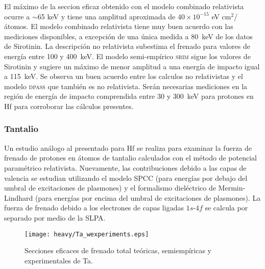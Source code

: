 El máximo de la seccion eficaz obtenido con el modelo combinado 
relativista ocurre a $\sim$65 keV y tiene una amplitud aproximada de 
$40\times 10^{-15}$ eV cm$^2$/átomos. 
El modelo combinado relativista tiene muy buen acuerdo con las 
mediciones disponibles, a excepción de una única medida a 80~keV de los 
datos de Sirotinin. La descripción no relativista subestima el frenado 
para valores de energía entre 100 y 400~keV. El modelo semi-empírico 
\textsc{srim} sigue los valores de Sirotinin y 
sugiere un máximo de menor amplitud a una energía de impacto igual a 
115~keV. Se observa un buen acuerdo entre los calculos no relativistas 
y el modelo \textsc{dpass} que también es no relativista. 
Serán necesarias mediciones en la región de energía de impacto 
comprendida entre 30 y 300~keV para protones en Hf para corroborar las 
cálculos presentes. 

\subsubsection{Tantalio}
\label{subsec:tantalio}

Un estudio análogo al presentado para Hf se realiza para examinar la 
fuerza de frenado de protones en átomos de tantalio calculados con el 
método de potencial paramétrico relativista. Nuevamente, las 
contribuciones debido a las capas de valencia se estudian utilizando el 
modelo SPCC (para energías por debajo del umbral de excitaciones de 
plasmones) y el formalismo dieléctrico de Mermin-Lindhard (para energías 
por encima del umbral de excitaciones de plasmones). La fuerza de 
frenado debido a los electrones de capas ligadas $1s$-$4f$ se calcula 
por separado por medio de la SLPA.

\begin{figure}[t]
\centering
\texttt{[image: heavy/Ta\_wexperiments.eps]}
\caption[Secciones eficaces teóricas, semiempíricas y experimentales de 
Ta.]
{Secciones eficaces de frenado total teóricas, semiempíricas y
experimentales de Ta.}
\label{fig:Ta_SP}
\end{figure}

